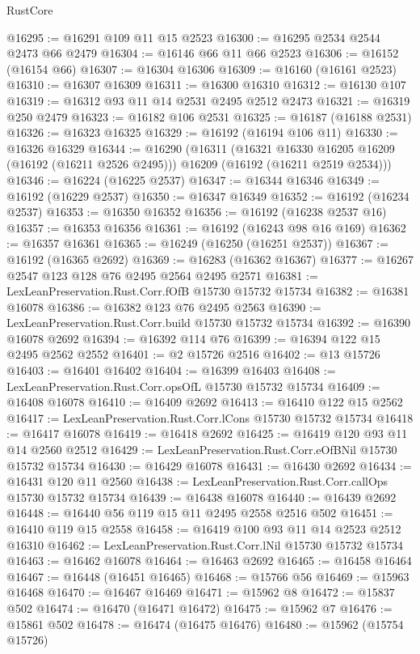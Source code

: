 \begin{lexlean}{RustCore}
\begin{coremodule}
@16295 := @16291 @109 @11 @15 @2523
@16300 := @16295 @2534 @2544 @2473 @66 @2479
@16304 := @16146 @66 @11 @66 @2523
@16306 := @16152 (@16154 @66)
@16307 := @16304 @16306
@16309 := @16160 (@16161 @2523)
@16310 := @16307 @16309
@16311 := @16300 @16310
@16312 := @16130 @107
@16319 := @16312 @93 @11 @14 @2531 @2495 @2512 @2473
@16321 := @16319 @250 @2479
@16323 := @16182 @106 @2531
@16325 := @16187 (@16188 @2531)
@16326 := @16323 @16325
@16329 := @16192 (@16194 @106 @11)
@16330 := @16326 @16329
@16344 := @16290
    (@16311
      (@16321 @16330 @16205 @16209 (@16192 (@16211 @2526 @2495)))
      @16209
      (@16192 (@16211 @2519 @2534)))
@16346 := @16224 (@16225 @2537)
@16347 := @16344 @16346
@16349 := @16192 (@16229 @2537)
@16350 := @16347 @16349
@16352 := @16192 (@16234 @2537)
@16353 := @16350 @16352
@16356 := @16192 (@16238 @2537 @16)
@16357 := @16353 @16356
@16361 := @16192 (@16243 @98 @16 @169)
@16362 := @16357 @16361
@16365 := @16249 (@16250 (@16251 @2537))
@16367 := @16192 (@16365 @2692)
@16369 := @16283 (@16362 @16367)
@16377 := @16267 @2547 @123 @128 @76 @2495 @2564 @2495 @2571
@16381 := LexLeanPreservation.Rust.Corr.fOfB @15730 @15732 @15734
@16382 := @16381 @16078
@16386 := @16382 @123 @76 @2495 @2563
@16390 := LexLeanPreservation.Rust.Corr.build @15730 @15732 @15734
@16392 := @16390 @16078 @2692
@16394 := @16392 @114 @76
@16399 := @16394 @122 @15 @2495 @2562 @2552
@16401 := @2 @15726 @2516
@16402 := @13 @15726
@16403 := @16401 @16402
@16404 := @16399 @16403
@16408 := LexLeanPreservation.Rust.Corr.opsOfL @15730 @15732 @15734
@16409 := @16408 @16078
@16410 := @16409 @2692
@16413 := @16410 @122 @15 @2562
@16417 := LexLeanPreservation.Rust.Corr.lCons @15730 @15732 @15734
@16418 := @16417 @16078
@16419 := @16418 @2692
@16425 := @16419 @120 @93 @11 @14 @2560 @2512
@16429 := LexLeanPreservation.Rust.Corr.eOfBNil @15730 @15732 @15734
@16430 := @16429 @16078
@16431 := @16430 @2692
@16434 := @16431 @120 @11 @2560
@16438 := LexLeanPreservation.Rust.Corr.callOps @15730 @15732 @15734
@16439 := @16438 @16078
@16440 := @16439 @2692
@16448 := @16440 @56 @119 @15 @11 @2495 @2558 @2516 @502
@16451 := @16410 @119 @15 @2558
@16458 := @16419 @100 @93 @11 @14 @2523 @2512 @16310
@16462 := LexLeanPreservation.Rust.Corr.lNil @15730 @15732 @15734
@16463 := @16462 @16078
@16464 := @16463 @2692
@16465 := @16458 @16464
@16467 := @16448 (@16451 @16465)
@16468 := @15766 @56
@16469 := @15963 @16468
@16470 := @16467 @16469
@16471 := @15962 @8
@16472 := @15837 @502
@16474 := @16470 (@16471 @16472)
@16475 := @15962 @7
@16476 := @15861 @502
@16478 := @16474 (@16475 @16476)
@16480 := @15962 (@15754 @15726)

\end{coremodule}
\end{lexlean}
